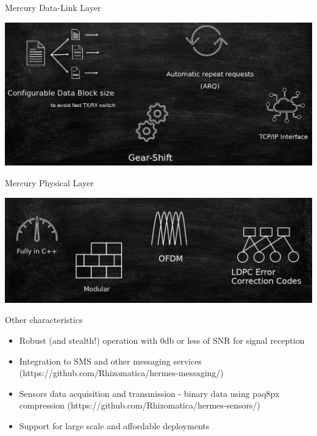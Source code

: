 \documentclass[aspectratio=169,xcolor={x11names,svgnames,dvipsnames}]{beamer}
\begin{document}
\begin{frame}{Mercury Data-Link Layer}

  \begin{center}
    \includegraphics[width=.95\columnwidth]{mercury2.jpg}
  \end{center}

\end{frame}

\begin{frame}{Mercury Physical Layer}

  \begin{center}
    \includegraphics[width=.95\columnwidth]{mercury3.jpg}
  \end{center}

\end{frame}


\begin{frame}{Other characteristics}

  \begin{itemize}
  \item Robust (and stealth!) operation with 0db or less of SNR for signal reception
  \item Integration to SMS and other messaging services (https://github.com/Rhizomatica/hermes-messaging/)
  \item Sensors data acquisition and transmission - binary data using paq8px compression (https://github.com/Rhizomatica/hermes-sensors/)
  \item Support for large scale and affordable deployments
  \end{itemize}
\end{frame}
\end{document}
